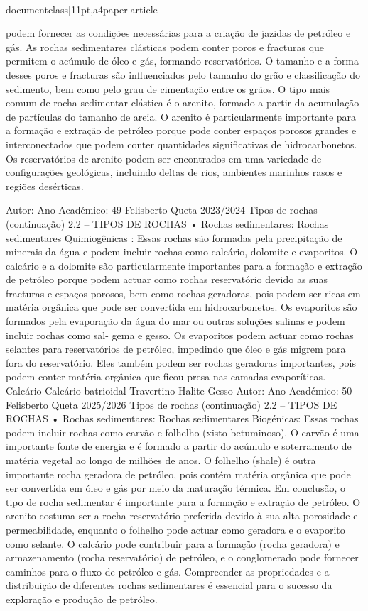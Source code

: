 \\documentclass[11pt,a4paper]{article}
\begin{document}
podem fornecer as condições necessárias para a criação de
jazidas de petróleo e gás. As rochas sedimentares clásticas
podem conter poros e fracturas que permitem o acúmulo de
óleo e gás, formando reservatórios. O tamanho e a forma
desses poros e fracturas são influenciados pelo tamanho do
grão e classificação do sedimento, bem como pelo grau de
cimentação entre os grãos.
O tipo mais comum de rocha sedimentar clástica é o arenito,
formado a partir da acumulação de partículas do tamanho de
areia. O arenito é particularmente importante para a formação
e extração de petróleo porque pode conter espaços porosos
grandes e interconectados que podem conter quantidades
significativas de hidrocarbonetos. Os reservatórios de arenito
podem ser encontrados em uma variedade de configurações
geológicas, incluindo deltas de rios, ambientes marinhos
rasos e regiões desérticas.\

Autor:
Ano Académico:
49
Felisberto Queta
2023/2024
Tipos de rochas (continuação)
2.2 – TIPOS DE ROCHAS
• Rochas sedimentares: Rochas sedimentares Quimiogênicas : 
Essas rochas são formadas pela precipitação de minerais da
água e podem incluir rochas como calcário, dolomite e
evaporitos. O calcário e a dolomite são particularmente
importantes para a formação e extração de petróleo porque
podem actuar como rochas reservatório devido as suas
fracturas e espaços porosos, bem como rochas geradoras, pois
podem ser ricas em matéria orgânica que pode ser convertida
em hidrocarbonetos.
Os evaporitos são formados pela evaporação da água do mar
ou outras soluções salinas e podem incluir rochas como sal-
gema e gesso. Os evaporitos podem actuar como rochas
selantes para reservatórios de petróleo, impedindo que óleo e
gás migrem para fora do reservatório. Eles também podem ser
rochas geradoras importantes, pois podem conter matéria
orgânica que ficou presa nas camadas evaporíticas.
Calcário
Calcário 
batrioidal
Travertino
Halite
Gesso
Autor:
Ano Académico:
50
Felisberto Queta
2025/2026
Tipos de rochas (continuação)
2.2 – TIPOS DE ROCHAS
• Rochas sedimentares: Rochas sedimentares Biogénicas: 
Essas rochas podem incluir rochas como carvão e folhelho
(xisto betuminoso). O carvão é uma importante fonte de 
energia e é formado a partir do acúmulo e soterramento de 
matéria vegetal ao longo de milhões de anos. O folhelho 
(shale) é outra importante rocha geradora de petróleo, pois 
contém matéria orgânica que pode ser convertida em óleo e gás 
por meio da maturação térmica.
Em conclusão, o tipo de rocha sedimentar é importante para a
formação e extração de petróleo. O arenito costuma ser a
rocha-reservatório preferida devido à sua alta porosidade e
permeabilidade, enquanto o folhelho pode actuar como
geradora e o evaporito como selante. O calcário pode
contribuir para a formação (rocha geradora) e armazenamento
(rocha reservatório) de petróleo, e o conglomerado pode
fornecer caminhos para o fluxo de petróleo e gás. Compreender
as propriedades e a distribuição de diferentes rochas
sedimentares é essencial para o sucesso da exploração e
produção de petróleo.\
\end{document}

